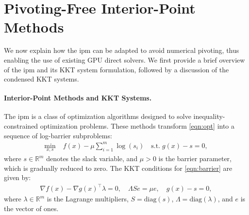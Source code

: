 \documentclass{article}
\begin{document}
\section{Pivoting-Free Interior-Point Methods}\label{eqn:ipm}
We now explain how the \gls*{ipm} can be adapted to avoid numerical pivoting, thus enabling the use of existing GPU direct solvers. We first provide a brief overview of the \gls*{ipm} and its KKT system formulation, followed by a discussion of the condensed KKT systems.

\paragraph{Interior-Point Methods and KKT Systems.}
The \gls*{ipm} is a class of optimization algorithms designed to solve inequality-constrained optimization problems. These methods transform \cref{eqn:opt} into a sequence of log-barrier subproblems:
\begin{align}\label{eqn:barrier}
  \min_{x,s} \; & f(x) - \mu \sum_{i=1}^m \log(s_i) \quad \text{s.t.} \; g(x) - s = 0,
\end{align}
where $s \in \mathbb{R}^m$ denotes the slack variable, and $\mu > 0$ is the barrier parameter, which is gradually reduced to zero.
The KKT conditions for \cref{eqn:barrier} are given by:
\begin{align}\label{eqn:kkt}
  \nabla f(x) - \nabla g(x)^\top \lambda = 0, \quad
  \Lambda S e = \mu e, \quad
  g(x) - s = 0,
\end{align}
where $\lambda \in \mathbb{R}^m$ is the Lagrange multipliers, $S = \text{diag}(s)$, $\Lambda = \text{diag}(\lambda)$, and $e$ is the vector of ones.
\end{document}
